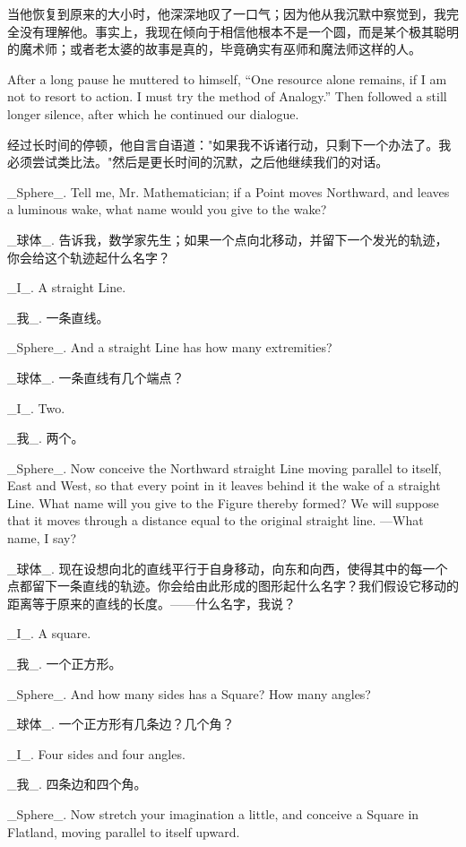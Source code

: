 \documentclass[12pt,UTF8]{ctexbook}
\begin{document}
当他恢复到原来的大小时，他深深地叹了一口气；因为他从我沉默中察觉到，我完全没有理解他。事实上，我现在倾向于相信他根本不是一个圆，而是某个极其聪明的魔术师；或者老太婆的故事是真的，毕竟确实有巫师和魔法师这样的人。

After a long pause he muttered to himself, ``One resource alone remains, if I am not to resort to action. I must try the method of Analogy.'' Then followed a still longer silence, after which he continued our dialogue.

经过长时间的停顿，他自言自语道："如果我不诉诸行动，只剩下一个办法了。我必须尝试类比法。"然后是更长时间的沉默，之后他继续我们的对话。

\_Sphere\_. Tell me, Mr. Mathematician; if a Point moves Northward, and leaves a luminous wake, what name would you give to the wake?

\_球体\_. 告诉我，数学家先生；如果一个点向北移动，并留下一个发光的轨迹，你会给这个轨迹起什么名字？

\_I\_. A straight Line.

\_我\_. 一条直线。

\_Sphere\_. And a straight Line has how many extremities?

\_球体\_. 一条直线有几个端点？

\_I\_. Two.

\_我\_. 两个。

\_Sphere\_. Now conceive the Northward straight Line moving parallel to itself, East and West, so that every point in it leaves behind it the wake of a straight Line. What name will you give to the Figure thereby formed? We will suppose that it moves through a distance equal to the original straight line. ---What name, I say?

\_球体\_. 现在设想向北的直线平行于自身移动，向东和向西，使得其中的每一个点都留下一条直线的轨迹。你会给由此形成的图形起什么名字？我们假设它移动的距离等于原来的直线的长度。——什么名字，我说？

\_I\_. A square.

\_我\_. 一个正方形。

\_Sphere\_. And how many sides has a Square? How many angles?

\_球体\_. 一个正方形有几条边？几个角？

\_I\_. Four sides and four angles.

\_我\_. 四条边和四个角。

\_Sphere\_. Now stretch your imagination a little, and conceive a Square in Flatland, moving parallel to itself upward.
\end{document}
